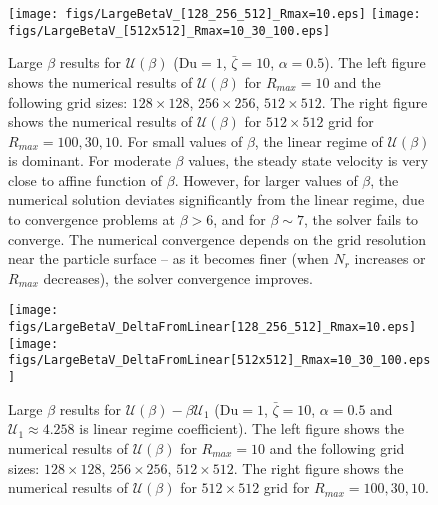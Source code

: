 \documentclass[MSc,beforeExam]{iitcsthesis}
\newcommand\Du{\text{Du}}
\newcommand\cU{\mathscr{U}}
\begin{document}
\begin{figure}
    \begin{center}
    \texttt{[image: figs/LargeBetaV\_[128\_256\_512]\_Rmax=10.eps]}
    \texttt{[image: figs/LargeBetaV\_[512x512]\_Rmax=10\_30\_100.eps]}
        \caption[Large $\beta$ results for $\cU$]
{Large $\beta$ results for $\cU(\beta)$ ($\Du = 1$, $\bar\zeta = 10$, $\alpha = 0.5$). 
The left figure shows the numerical results of $\cU(\beta)$ for $R_{max} = 10$ and the following grid sizes: $128 \times 128$, $256 \times 256$, $512 \times 512$. 
The right figure shows the numerical results of $\cU(\beta)$ for
$512 \times 512$ grid for $R_{max} = 100, 30, 10$. For small values of $\beta$, the linear
regime of $\cU(\beta)$ is dominant. 
For moderate $\beta$ values, the steady state velocity is very close to affine function of $\beta$.
However, for larger values of $\beta$, the numerical solution
deviates significantly from the linear regime, due to convergence problems at $\beta > 6$, 
and for $\beta \sim 7$, the solver fails to converge. The numerical convergence 
depends on the grid resolution near the particle surface -- 
as it becomes finer (when $N_r$ increases or $R_{max}$ decreases), the solver convergence improves.}
	    \label{fig:LargeBetaV_grids}	    
    \end{center}
\end{figure}
\begin{figure}
    \begin{center}
    \texttt{[image: figs/LargeBetaV\_DeltaFromLinear[128\_256\_512]\_Rmax=10.eps]}
    \texttt{[image: figs/LargeBetaV\_DeltaFromLinear[512x512]\_Rmax=10\_30\_100.eps]}
        \caption[Large $\beta$ results for $\cU$ -- difference from linear regime]
{Large $\beta$ results for $\cU(\beta) - \beta\cU_1$ ($\Du = 1$, $\bar\zeta = 10$, $\alpha = 0.5$ and $\cU_1 \approx 4.258$ is linear regime coefficient). 
The left figure shows the numerical results of $\cU(\beta)$ for $R_{max} = 10$ and the following grid sizes: $128 \times 128$, $256 \times 256$, $512 \times 512$. 
The right figure shows the numerical results of $\cU(\beta)$ for
$512 \times 512$ grid for $R_{max} = 100, 30, 10$.}
	    \label{fig:LargeBetaV_DeltaFromLinear_grids}	    
    \end{center}
\end{figure}
\end{document}
